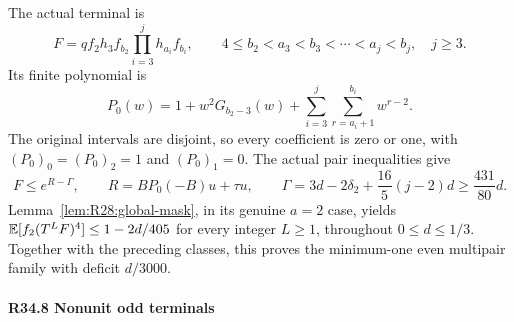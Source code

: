 The actual terminal is
\[
 F=qf_2h_3f_{b_2}\prod_{i=3}^j h_{a_i}f_{b_i},
 \qquad 4\le b_2<a_3<b_3<\cdots<a_j<b_j,\quad j\ge3.
\]
Its finite polynomial is
\[
 P_0(w)=1+w^2G_{b_2-3}(w)
       +\sum_{i=3}^j\sum_{r=a_i+1}^{b_i}w^{r-2}.
\]
The original intervals are disjoint, so every coefficient is zero or
one, with \((P_0)_0=(P_0)_2=1\) and \((P_0)_1=0\).
The actual pair inequalities give
\[
 F\le e^{R-\Gamma},\qquad R=BP_0(-B)u+\tau u,\qquad
 \Gamma=3d-2\delta_2+\frac{16}{5}(j-2)d
       \ge\frac{431}{80}d.
\]
Lemma~\ref{lem:R28:global-mask}, in its genuine \(a=2\) case, yields
\(\mathbb E[f_2(T^LF)^4]\le1-2d/405\) for every integer \(L\ge1\),
throughout \(0\le d\le1/3\). Together with the preceding classes,
this proves the minimum-one even multipair family with deficit
\(d/3000\).

\paragraph{R34.8 Nonunit odd terminals}
\label{part:R34:nonunit-odd}

